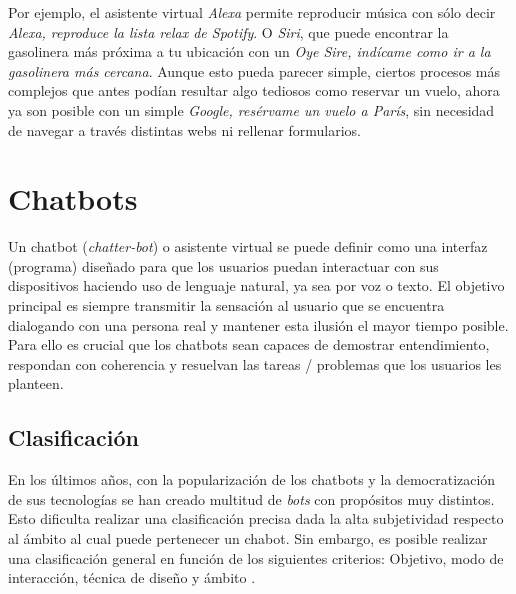 Por ejemplo, el asistente virtual \textit{Alexa} permite reproducir música con sólo decir \textit{Alexa, reproduce la lista relax de Spotify}. O \textit{Siri}, que puede encontrar la gasolinera más próxima a tu ubicación con un \textit{Oye Sire, indícame como ir a la gasolinera más cercana}. Aunque esto pueda parecer simple, ciertos procesos más complejos que antes podían resultar algo tediosos como reservar un vuelo, ahora ya son posible con un simple \textit{Google, resérvame un vuelo a París}, sin necesidad de navegar a través distintas webs ni rellenar formularios.\\



\section{Chatbots}
Un chatbot (\textit{chatter-bot}) o asistente virtual se puede definir como una interfaz (programa) diseñado para que los usuarios puedan interactuar con sus dispositivos haciendo uso de lenguaje natural, ya sea por voz o texto. El objetivo principal es siempre transmitir la sensación al usuario que se encuentra dialogando con una persona real y mantener esta ilusión el mayor tiempo posible. Para ello es crucial que los chatbots sean capaces de demostrar entendimiento, respondan con coherencia y resuelvan las tareas / problemas que los usuarios les planteen.\\

\subsection{Clasificación}
En los últimos años, con la popularización de los chatbots y la democratización de sus tecnologías se han creado multitud de \textit{bots} con propósitos muy distintos. Esto dificulta realizar una clasificación precisa dada la alta subjetividad respecto  al ámbito al cual puede pertenecer un chabot. Sin embargo, es posible realizar una clasificación general en función de los siguientes criterios: Objetivo, modo de interacción, técnica de diseño y ámbito \cite{designTechniques,chatbotTypes}.\\

